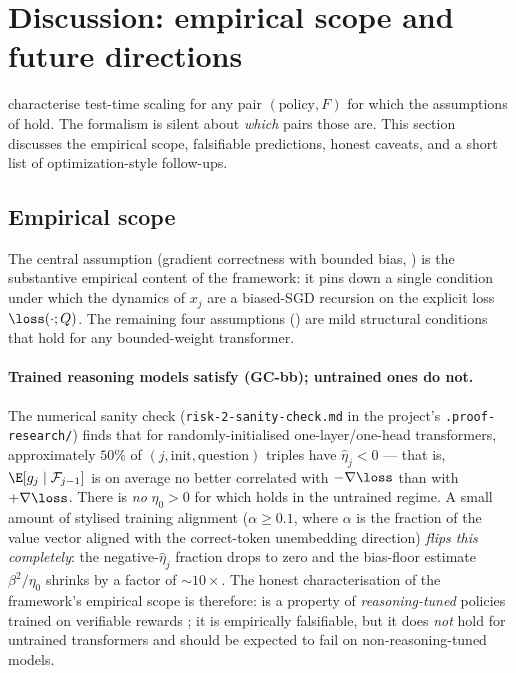 \section{Discussion: empirical scope and future directions}
\label{sec:discussion}

characterise test-time scaling for any pair $(\text{policy}, F)$ for
which the assumptions of  hold. The formalism is
silent about \emph{which} pairs those are. This section discusses the
empirical scope, falsifiable predictions, honest caveats, and a short
list of optimization-style follow-ups.

\subsection{Empirical scope}
\label{sec:discussion_scope}

The central assumption (gradient correctness with bounded bias,
) is the substantive
empirical content of the framework: it pins down a single condition
under which the dynamics of $x_j$ are a biased-SGD recursion on the
explicit loss $\loss(\cdot; Q)$. The remaining four assumptions
()
are mild structural conditions that hold for any bounded-weight
transformer.

\paragraph{Trained reasoning models satisfy (GC-bb); untrained ones do not.}
The numerical sanity check
(\texttt{risk-2-sanity-check.md} in the project's
\texttt{.proof-research/}) finds that for randomly-initialised
one-layer/one-head transformers, approximately $50\%$ of
$(j, \text{init}, \text{question})$ triples have $\hat \eta_j < 0$ ---
that is, $\E[g_j \mid \mathcal F_{j-1}]$ is on average no better
correlated with $-\nabla \loss$ than with $+\nabla \loss$. There is
\emph{no} $\eta_0 > 0$ for which 
holds in the untrained regime. A small amount of stylised training
alignment ($\alpha \ge 0.1$, where $\alpha$ is the fraction of the value
vector aligned with the correct-token unembedding direction)
\emph{flips this completely}: the negative-$\hat\eta_j$ fraction drops
to zero and the bias-floor estimate $\beta^2 / \eta_0$ shrinks by a
factor of $\sim 10\times$. The honest characterisation of the
framework's empirical scope is therefore:
 is a property of
\emph{reasoning-tuned} policies trained on verifiable rewards
\cite{openai2024o1, deepseek2025r1, qwen2025thinking}; it is empirically
falsifiable, but it does \emph{not} hold for untrained transformers and
should be expected to fail on non-reasoning-tuned models.

